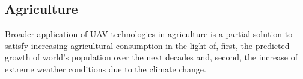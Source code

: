 




\subsection{Agriculture}

Broader application of UAV technologies in agriculture 
is a partial solution to satisfy 
increasing agricultural consumption
in the light of, first, the predicted growth of world's population
over the next decades 
and, second, the increase of
extreme weather conditions due 
to the climate change. 

